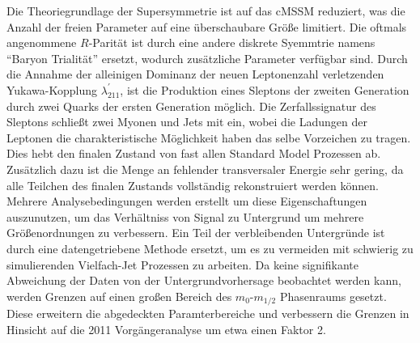 \documentclass[11pt,a4paper,twoside,openright,DIV=13,BCOR=1cm]{scrbook} %
\numberwithin{equation}{chapter} %
\numberwithin{figure}{chapter} %
\numberwithin{table}{chapter} %
\begin{document}
Die Theoriegrundlage der Supersymmetrie ist auf das cMSSM reduziert, was die Anzahl der freien Parameter auf eine überschaubare Größe limitiert. Die oftmals angenommene $R$-Parität ist durch eine andere diskrete Syemmtrie namens ``Baryon Trialität'' ersetzt, wodurch zusätzliche Parameter verfügbar sind. Durch die Annahme der alleinigen Dominanz der neuen Leptonenzahl verletzenden Yukawa-Kopplung $\lambda^\prime_{211}$, ist die Produktion eines Sleptons der zweiten Generation durch zwei Quarks der ersten Generation möglich. Die Zerfallssignatur des Sleptons schließt zwei Myonen und Jets mit ein, wobei die Ladungen der Leptonen die charakteristische Möglichkeit haben das selbe Vorzeichen zu tragen. Dies hebt den finalen Zustand von fast allen Standard Model Prozessen ab. Zusätzlich dazu ist die Menge an fehlender transversaler Energie sehr gering, da alle Teilchen des finalen Zustands vollständig rekonstruiert werden können. Mehrere Analysebedingungen werden erstellt um diese Eigenschaftungen auszunutzen, um das Verhältniss von Signal zu Untergrund um mehrere Größenordnungen zu verbessern. Ein Teil der verbleibenden Untergründe ist durch eine datengetriebene Methode ersetzt, um es zu vermeiden mit schwierig zu simulierenden Vielfach-Jet Prozessen zu arbeiten. Da keine signifikante Abweichung der Daten von der Untergrundvorhersage beobachtet werden kann, werden Grenzen auf einen großen Bereich des $m_0$-$m_{1/2}$ Phasenraums gesetzt. Diese erweitern die abgedeckten Paramterbereiche und verbessern die Grenzen in Hinsicht auf die 2011 Vorgängeranalyse um etwa einen Faktor 2.


\newpage
\tableofcontents















\appendix





\printbibliography[heading=bibintoc]
% 
% 
\end{document}
